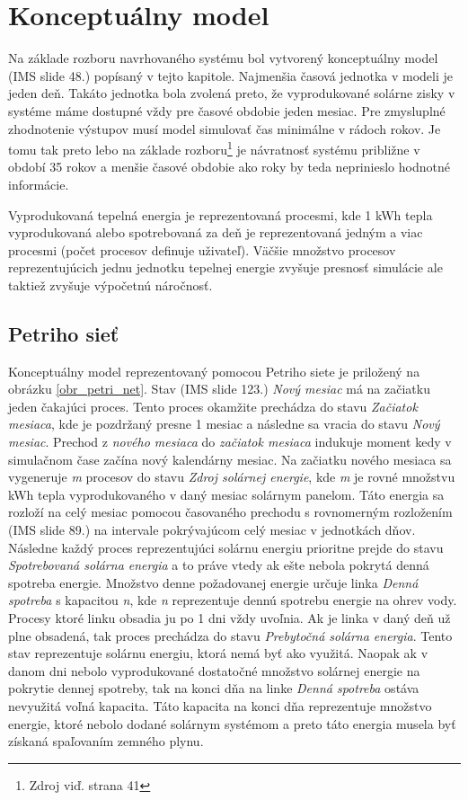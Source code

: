 \documentclass[a4paper, 11pt]{article}
\begin{document}
\section{Konceptuálny model}
Na základe rozboru navrhovaného systému bol vytvorený konceptuálny model (IMS\cite{ims_slides} slide 48.) popísaný v tejto kapitole.  Najmenšia časová jednotka v modeli je jeden deň. Takáto jednotka bola zvolená preto, že vyprodukované solárne zisky v systéme máme dostupné vždy pre časové obdobie jeden mesiac. Pre zmysluplné zhodnotenie výstupov musí model simulovať čas minimálne v rádoch rokov. Je tomu tak preto lebo na základe rozboru\footnote{Zdroj\cite{bc_solar_system} viď. strana 41} je návratnosť systému približne v období 35 rokov a menšie časové obdobie ako roky by teda neprinieslo hodnotné informácie. 

Vyprodukovaná tepelná energia je reprezentovaná procesmi, kde 1 kWh tepla vyprodukovaná alebo spotrebovaná za deň je reprezentovaná jedným a viac procesmi (počet procesov definuje uživateľ). Väčšie množstvo procesov reprezentujúcich jednu jednotku tepelnej energie zvyšuje presnosť simulácie ale taktiež zvyšuje výpočetnú náročnosť. 


\subsection{Petriho sieť} \label{petri_net_section}
Konceptuálny model reprezentovaný pomocou Petriho siete je priložený na obrázku \ref{obr_petri_net}. Stav (IMS\cite{ims_slides} slide 123.) \textit{Nový mesiac} má na začiatku jeden čakajúci proces. Tento proces okamžite prechádza do stavu \textit{Začiatok mesiaca}, kde je pozdržaný presne 1 mesiac a následne sa vracia do stavu \textit{Nový mesiac}. Prechod z \textit{nového mesiaca} do \textit{začiatok mesiaca} indukuje moment kedy v simulačnom čase začína nový kalendárny mesiac. Na začiatku nového mesiaca sa vygeneruje \textit{m} procesov do stavu \textit{Zdroj solárnej energie}, kde \textit{m} je rovné množstvu kWh tepla vyprodukovaného v daný mesiac solárnym panelom. Táto energia sa rozloží na celý mesiac pomocou časovaného prechodu s rovnomerným rozložením (IMS\cite{ims_slides} slide 89.) na intervale pokrývajúcom celý mesiac v jednotkách dňov. Následne každý proces reprezentujúci solárnu energiu prioritne prejde do stavu \textit{Spotrebovaná solárna energia} a to práve vtedy ak ešte nebola pokrytá denná spotreba energie. Množstvo denne požadovanej energie určuje linka \textit{Denná spotreba} s kapacitou \textit{n}, kde \textit{n} reprezentuje dennú spotrebu energie na ohrev vody. Procesy ktoré linku obsadia ju po 1 dni vždy uvoľnia. Ak je linka v daný deň už plne obsadená, tak proces prechádza do stavu \textit{Prebytočná solárna energia}. Tento stav reprezentuje solárnu energiu, ktorá nemá byť ako využitá. Naopak ak v danom dni nebolo vyprodukované dostatočné množstvo solárnej energie na pokrytie dennej spotreby, tak na konci dňa na linke \textit{Denná spotreba} ostáva nevyužitá voľná kapacita. Táto kapacita na konci dňa reprezentuje množstvo energie, ktoré nebolo dodané solárnym systémom a preto táto energia musela byť získaná spaľovaním zemného plynu.
\end{document}
